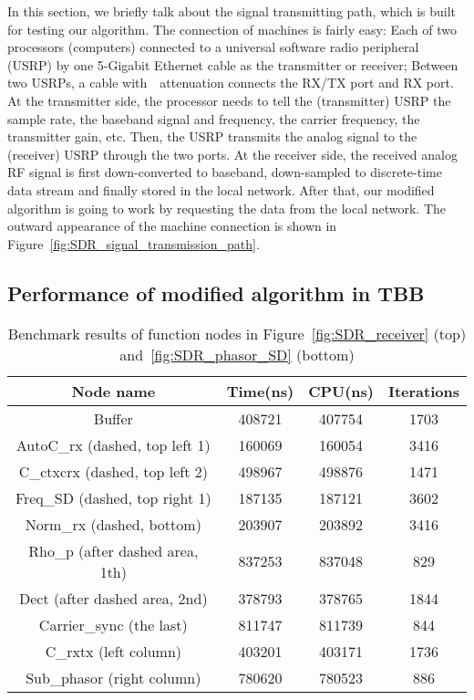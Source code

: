 In this section, we briefly talk about the signal transmitting path, which is built 
for testing our algorithm. The connection of machines is fairly easy: 
Each of two processors (computers) connected to a universal software radio peripheral (USRP) 
by one 5-Gigabit Ethernet cable as the transmitter or receiver; Between two USRPs,
a cable with~\dB~attenuation connects the RX/TX port and RX port.
At the transmitter side, the processor needs to tell the (transmitter) USRP the sample rate, 
the baseband signal and frequency, the carrier frequency, the transmitter gain, etc. 
Then, the USRP transmits the analog signal to the (receiver) USRP through the two ports.
At the receiver side, the received analog RF signal is first down-converted to baseband, down-sampled to 
discrete-time data stream and finally stored in the local network. After that, our modified algorithm is going to work by requesting the data from the local network.
The outward appearance of the machine connection is shown in Figure~\ref{fig:SDR_signal_transmission_path}.

\subsection{Performance of modified algorithm in TBB}

\begin{table}[t]
  \caption{Benchmark results of function nodes in Figure~\ref{fig:SDR_receiver} (top) and~\ref{fig:SDR_phasor_SD} (bottom)}  %
  \centering %
  \begin{tabular}{c c c c} %
  \hline\hline %
  Node name & Time(ns) & CPU(ns) & Iterations \\ [0.5ex] %
  \hline %
  Buffer  & 408721 & 407754 & 1703 \\ %
  AutoC\_rx (dashed, top left 1) & 160069 & 160054 & 3416 \\
  C\_ctxcrx (dashed, top left 2) & 498967 & 498876 & 1471 \\
  Freq\_SD (dashed, top right 1) & 187135 & 187121 & 3602 \\
  Norm\_rx (dashed, bottom) & 203907 & 203892 & 3416 \\ %
  Rho\_p (after dashed area, 1th) & 837253 & 837048 & 829 \\
  Dect (after dashed area, 2nd) & 378793 & 378765 & 1844 \\
  Carrier\_sync (the last) & 811747 & 811739 & 844  \\ [1ex]

  \hline %
  C\_rxtx (left column) & 403201 & 403171 & 1736 \\ %
  Sub\_phasor (right column) & 780620 & 780523 & 886 \\ [1ex]
  \hline
  \end{tabular}
  \label{table:BM_function_nodes} %
\end{table}
  

